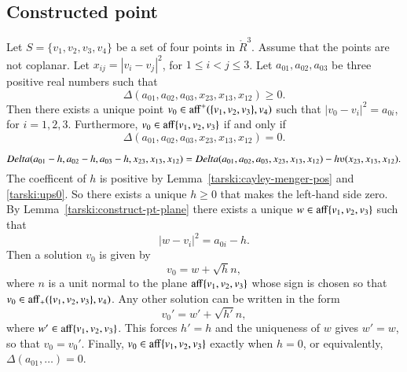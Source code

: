 \begin{tarskidata}
\begin{tarski}
\section{Constructed point}

\begin{lemma}
Let $S=\{v_1,v_2,v_3,v_4\}$ be a set of four points
in $\ring{R}^3$.  Assume that the points are not coplanar.
Let $x_{ij} = |v_i-v_j|^2$, for $1\le i < j\le 3$.
Let $a_{01},a_{02},a_{03}$ be three positive real numbers such that
$$
  \Delta(a_{01},a_{02},a_{03},x_{23},x_{13},x_{12})\ge0.
$$
Then there exists a unique point $v_0\in{\operatorname{aff}}^+(\{v_1,v_2,v_3\},v_4)$
such that
   $|v_0-v_i|^2 = a_{0i}$, for $i=1,2,3$.
Furthermore, $v_0\in{\operatorname{aff}}\{v_1,v_2,v_3\}$ if and only if 
 $$
  \Delta(a_{01},a_{02},a_{03},x_{23},x_{13},x_{12})=0.
$$
\end{lemma}

\begin{proved} 
$$
\Delta(a_{01}-h,a_{02}-h,a_{03}-h,x_{23},x_{13},x_{12})=
\Delta(a_{01},a_{02},a_{03},x_{23},x_{13},x_{12})-h\ups(x_{23},x_{13},x_{12}).
$$
The coefficent of $h$ is positive by Lemma~\ref{tarski:cayley-menger-pos} and \ref{tarski:ups0}.
So there exists a unique $h\ge 0$ that makes the left-hand side zero.
By Lemma~\ref{tarski:construct-pt-plane} there exists a unique $w\in{\operatorname{aff}}\{v_1,v_2,v_3\}$ such that
 $$
 |w-v_i|^2 = a_{0i} - h.
 $$
Then a solution $v_0$ is given by
 $$
 v_0 = w + \sqrt{h} n,
 $$
where $n$ is a unit normal to the plane ${\operatorname{aff}}\{v_1,v_2,v_3\}$ whose sign is chosen
so that $v_0\in{\operatorname{aff}}_+(\{v_1,v_2,v_3\},v_4)$.  Any other solution can be written in the
form 
  $$
  v_0' = w' + \sqrt{h'} n,
  $$
where $w'\in{\operatorname{aff}}\{v_1,v_2,v_3\}$.  This forces $h'=h$ and the uniqueness of $w$ gives
$w'=w$, so that $v_0=v_0'$.  Finally, $v_0\in{\operatorname{aff}}\{v_1,v_2,v_3\}$ exactly when $h=0$,
or equivalently, $\Delta(a_{01},\ldots)=0$.
\swallowed\end{proved}
\end{tarski}






\end{tarskidata}
